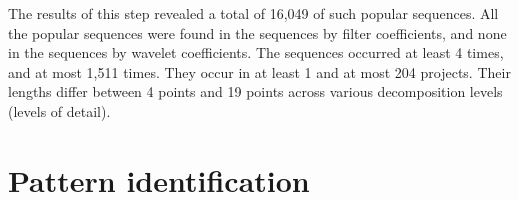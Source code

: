 The results of this step revealed a total of 16,049 of such popular sequences.
All the popular sequences were found in the sequences by filter coefficients,
and none in the sequences by wavelet coefficients. The sequences occurred at
least 4 times, and at most 1,511 times. They occur in at least 1 and at most 204
projects. Their lengths differ between 4 points and 19 points across various
decomposition levels (levels of detail).

\section{Pattern identification}



\begin{comment}
This chapter reports on the execution of the research method as described in Chapter 3.

If the research has been divided into phases (e.g., using sub questions) the
phases are introduced, reported on and concluded individually. If needed this
Chapter could be split up to balance out the sizes of all Chapters.
An example Research Chapter is provided as Chapter 3 at Paul’s home
page\footnote{http://homepages.cwi.nl/~paulk/thesesMasterSoftwareEngineering/2006/ReneWiegers.pdf}.
\end{comment}
